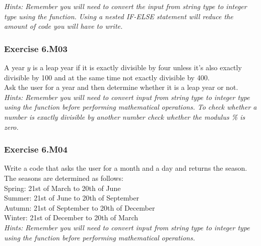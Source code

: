 \textit{Hints:
Remember you will need to convert the input from string type to integer type using the
{} function. Using a nested IF-ELSE statement will reduce the amount of code you will have to write.}\\[1cm]



\subsubsection*{Exercise 6.M03 \red{[M]}}
A year $y$ is a leap year if it is exactly divisible by four unless it’s also exactly divisible by 100 and at the same time not exactly divisible by 400.\\
Ask the user for a year and then determine whether it is a leap year or not.\\


\textit{Hints:
Remember you will need to convert input from string type to integer type using the {} function before performing mathematical operations. To check whether a number is exactly divisible by another number check whether the modulus \% is zero.}\\[1cm]



\subsubsection*{Exercise 6.M04}
Write a code that asks the user for a month and a day and returns the season.
The seasons are determined as follows:\\
\hspace*{5mm}Spring: 21st of March to 20th of June\\
\hspace*{5mm}Summer: 21st of June to 20th of September\\
\hspace*{5mm}Autumn: 21st of September to 20th of December\\
\hspace*{5mm}Winter: 21st of December to 20th of March\\


\textit{Hints:
Remember you will need to convert input from string type to integer type using the {} function before performing mathematical operations.}
\\[1cm]


